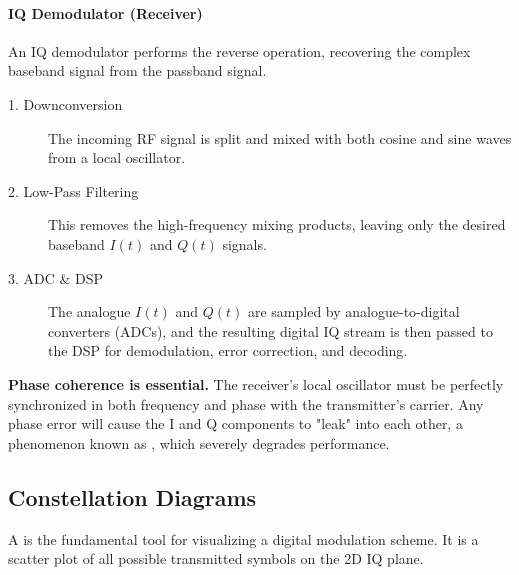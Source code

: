\paragraph{IQ Demodulator (Receiver)}
An IQ demodulator performs the reverse operation, recovering the complex baseband signal from the passband signal.
\begin{description}
    \item[1. Downconversion] The incoming RF signal is split and mixed with both cosine and sine waves from a local oscillator.
    \item[2. Low-Pass Filtering] This removes the high-frequency mixing products, leaving only the desired baseband $I(t)$ and $Q(t)$ signals.
    \item[3. ADC \& DSP] The analogue $I(t)$ and $Q(t)$ are sampled by analogue-to-digital converters (ADCs), and the resulting digital IQ stream is then passed to the DSP for demodulation, error correction, and decoding.
\end{description}

\begin{warningbox}
    \textbf{Phase coherence is essential.} The receiver's local oscillator must be perfectly synchronized in both frequency and phase with the transmitter's carrier. Any phase error will cause the I and Q components to "leak" into each other, a phenomenon known as , which severely degrades performance.
\end{warningbox}

\subsection{Constellation Diagrams}

A  is the fundamental tool for visualizing a digital modulation scheme. It is a scatter plot of all possible transmitted symbols on the 2D IQ plane.

\begin{center}
\end{center}


